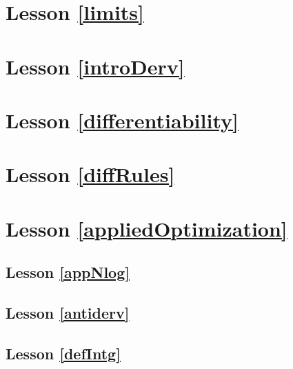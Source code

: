 \section*{Lesson \ref{limits}}

\newpage
\section*{Lesson \ref{introDerv}}

\newpage
\section*{Lesson \ref{differentiability}}

\newpage
\section*{Lesson \ref{diffRules}}


\newpage
\section*{Lesson \ref{appliedOptimization}}

\newpage
\subsection*{Lesson \ref{appNlog}}

\newpage
\subsection*{Lesson \ref{antiderv}}

\newpage
\subsection*{Lesson \ref{defIntg}}
